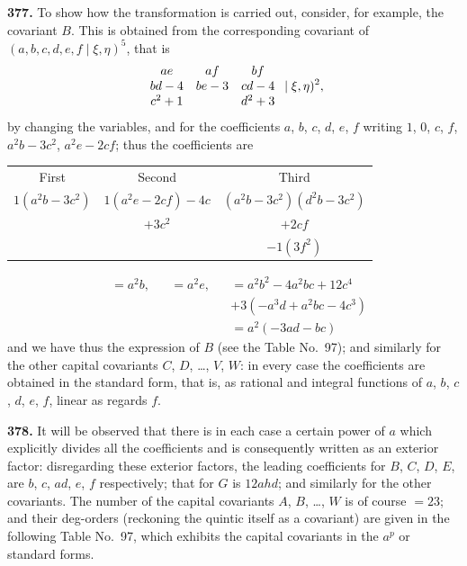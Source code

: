 \documentclass[11pt,a4paper]{book}
\begin{document}
\noindent\textbf{377.} To show how the transformation is carried out, consider, for example, the covariant $B$. This is obtained from the corresponding covariant of $(a, b, c, d, e, f \mid \xi, \eta)^5$, that is
\[
\begin{array}{c@{\quad}c@{\quad}c}
ae & af & bf \\
bd - 4 & be - 3 & cd - 4 \\
c^2 + 1 & & d^2 + 3
\end{array} \mid \xi, \eta)^2,
\]
by changing the variables, and for the coefficients $a$, $b$, $c$, $d$, $e$, $f$ writing $1$, $0$, $c$, $f$, $a^2 b - 3c^2$, $a^2 e - 2cf$; thus the coefficients are
\begin{center}
\begin{tabular}{c@{\quad}c@{\quad}c}
First & Second & Third \\[2pt]
$1(a^2 b - 3c^2)$ & $1(a^2 e - 2cf) - 4c$ & $(a^2 b - 3c^2)(d^2 b - 3c^2)$ \\
& $+ 3c^2$ & $+ 2cf$ \\
& & $- 1(3f^2)$
\end{tabular}
\end{center}
\begin{align*}
&= a^2 b, &&= a^2 e, &&= a^2 b^2 - 4a^2 bc + 12c^4 \\
& && && + 3(-a^3 d + a^2 bc - 4c^3) \\
& && && = a^2(-3ad - bc)
\end{align*}
and we have thus the expression of $B$ (see the Table No.~97); and similarly for the other capital covariants $C$, $D$, \ldots, $V$, $W$: in every case the coefficients are obtained in the standard form, that is, as rational and integral functions of $a$, $b$, $c$, $d$, $e$, $f$, linear as regards $f$.

\medskip

\noindent\textbf{378.} It will be observed that there is in each case a certain power of $a$ which explicitly divides all the coefficients and is consequently written as an exterior factor: disregarding these exterior factors, the leading coefficients for $B$, $C$, $D$, $E$, are $b$, $c$, $ad$, $e$, $f$ respectively; that for $G$ is $12ahd$; and similarly for the other covariants. The number of the capital covariants $A$, $B$, \ldots, $W$ is of course $=23$; and their deg-orders (reckoning the quintic itself as a covariant) are given in the following Table No.~97, which exhibits the capital covariants in the $a^p$ or standard forms.

\medskip
\end{document}

